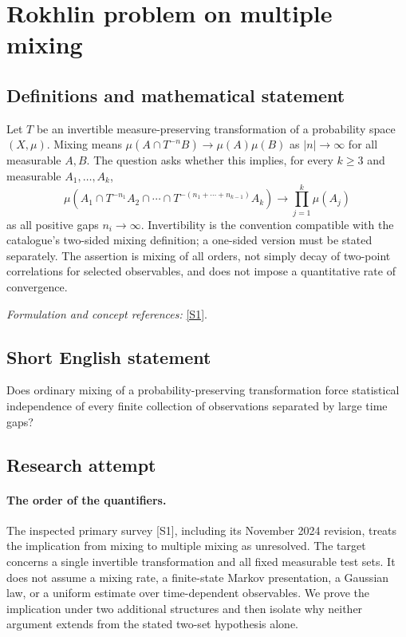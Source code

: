 \documentclass[11pt]{article}
\begin{document}
\section*{\texorpdfstring{Rokhlin problem on multiple mixing}{Rokhlin problem on multiple mixing}}\label{statement}
\subsection{Definitions and mathematical statement}
Let $T$ be an invertible measure-preserving transformation of a probability space $(X,\mu)$. Mixing means $\mu(A\cap T^{-n}B)\to\mu(A)\mu(B)$ as $|n|\to\infty$ for all measurable $A,B$. The question asks whether this implies, for every $k\ge3$ and measurable $A_1,\ldots,A_k$,
\[
 \mu\!\left(A_1\cap T^{-n_1}A_2\cap\cdots\cap
 T^{-(n_1+\cdots+n_{k-1})}A_k\right)
 \longrightarrow\prod_{j=1}^k\mu(A_j)
\]
as all positive gaps $n_i\to\infty$. Invertibility is the convention compatible with the catalogue's two-sided mixing definition; a one-sided version must be stated separately. The assertion is mixing of all orders, not simply decay of two-point correlations for selected observables, and does not impose a quantitative rate of convergence.
\par\smallskip\textit{Formulation and concept references:} \href{https://arxiv.org/abs/2411.07234}{[S1]}.

\subsection{Short English statement}
Does ordinary mixing of a probability-preserving transformation force statistical independence of every finite collection of observations separated by large time gaps?
\subsection{Research attempt}
\paragraph{The order of the quantifiers.}
The inspected primary survey [S1], including its November 2024
revision, treats the implication from mixing to multiple mixing as
unresolved. The target concerns a single invertible transformation
and all fixed measurable test sets. It does not assume a mixing rate,
a finite-state Markov presentation, a Gaussian law, or a uniform
estimate over time-dependent observables. We prove the implication
under two additional structures and then isolate why neither argument
extends from the stated two-set hypothesis alone.
\end{document}
